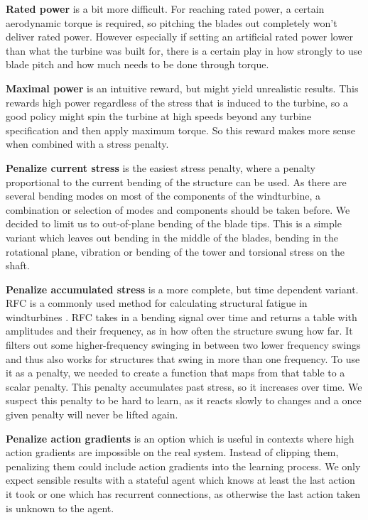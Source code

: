 \documentclass[hyperref,beleg]{cgvpub}
\begin{document}
\textbf{Rated power} is a bit more difficult. For reaching rated power, a certain aerodynamic torque is required, so pitching the blades out completely won't deliver rated power. However especially if setting an artificial rated power lower than what the turbine was built for, there is a certain play in how strongly to use blade pitch and how much needs to be done through torque.

\textbf{Maximal power} is an intuitive reward, but might yield unrealistic results. This rewards high power regardless of the stress that is induced to the turbine, so a good policy might spin the turbine at high speeds beyond any turbine specification and then apply maximum torque. So this reward makes more sense when combined with a stress penalty.

\textbf{Penalize current stress} is the easiest stress penalty, where a penalty proportional to the current bending of the structure can be used. As there are several bending modes on most of the components of the windturbine, a combination or selection of modes and components should be taken before. We decided to limit us to out-of-plane bending of the blade tips. This is a simple variant which leaves out bending in the middle of the blades, bending in the rotational plane, vibration or bending of the tower and torsional stress on the shaft.

\textbf{Penalize accumulated stress} is a more complete, but time dependent variant. \ac{RFC} is a commonly used method for calculating structural fatigue in windturbines \cite{berglindFatigueEstimationMethods2014}. \ac{RFC} takes in a bending signal over time and returns a table with amplitudes and their frequency, as in how often the structure swung how far. It filters out some higher-frequency swinging in between two lower frequency swings and thus also works for structures that swing in more than one frequency. To use it as a penalty, we needed to create a function that maps from that table to a scalar penalty. This penalty accumulates past stress, so it increases over time. We suspect this penalty to be hard to learn, as it reacts slowly to changes and a once given penalty will never be lifted again.

\textbf{Penalize action gradients} is an option which is useful in contexts where high action gradients are impossible on the real system. Instead of clipping them, penalizing them could include action gradients into the learning process. We only expect sensible results with a stateful agent which knows at least the last action it took or one which has recurrent connections, as otherwise the last action taken is unknown to the agent.
\end{document}
